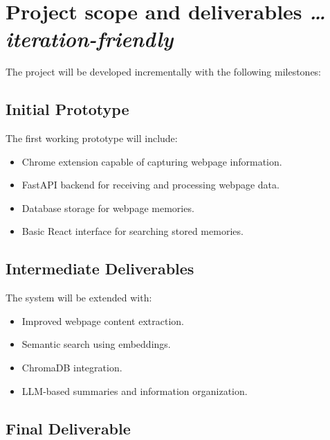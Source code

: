 \documentclass[11pt,a4paper]{article}
\newcommand{\BvrHint}[1]{%
  {\normalfont\normalsize\itshape\hfill #1}}
\begin{document}
\section{Project scope and deliverables %
\BvrHint{\ldots iteration-friendly}}

The project will be developed incrementally with the following milestones:


\subsection{Initial Prototype}

The first working prototype will include:

\begin{itemize}[leftmargin=0.7cm]

\item Chrome extension capable of capturing webpage information.

\item FastAPI backend for receiving and processing webpage data.

\item Database storage for webpage memories.

\item Basic React interface for searching stored memories.

\end{itemize}


\subsection{Intermediate Deliverables}

The system will be extended with:

\begin{itemize}[leftmargin=0.7cm]

\item Improved webpage content extraction.

\item Semantic search using embeddings.

\item ChromaDB integration.

\item LLM-based summaries and information organization.

\end{itemize}


\subsection{Final Deliverable}
\end{document}
